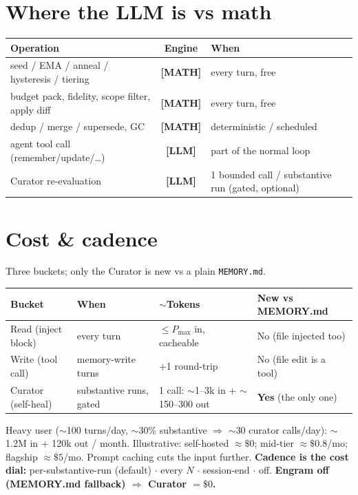 \documentclass[11pt]{article}
\newcommand{\mtag}{\textcolor{mathgreen}{\textbf{[MATH]}}}
\newcommand{\ltag}{\textcolor{llmred}{\textbf{[LLM]}}}
\begin{document}
\section{Where the LLM is vs math}
\begin{center}\small
\begin{tabular}{@{}p{6.6cm} c p{5.4cm}@{}}
\toprule
\textbf{Operation} & \textbf{Engine} & \textbf{When}\\
\midrule
seed / EMA / anneal / hysteresis / tiering & \mtag & every turn, free\\
budget pack, fidelity, scope filter, apply diff & \mtag & every turn, free\\
dedup / merge / supersede, GC & \mtag & deterministic / scheduled\\
\midrule
agent tool call (remember/update/\dots) & \ltag & part of the normal loop\\
Curator re-evaluation & \ltag & 1 bounded call / substantive run (gated, optional)\\
\bottomrule
\end{tabular}
\end{center}

\section{Cost \& cadence}
Three buckets; only the Curator is new vs a plain \texttt{MEMORY.md}.
\begin{center}\small
\begin{tabular}{@{}p{3.0cm} p{3.4cm} p{4.0cm} p{3.6cm}@{}}
\toprule
\textbf{Bucket} & \textbf{When} & \textbf{$\sim$Tokens} & \textbf{New vs MEMORY.md}\\
\midrule
Read (inject block) & every turn & $\le P_{\max}$ in, cacheable & No (file injected too)\\
Write (tool call) & memory-write turns & +1 round-trip & No (file edit is a tool)\\
Curator (self-heal) & substantive runs, gated & 1 call: $\sim$1--3k in + $\sim$150--300 out & \textbf{Yes} (the only one)\\
\bottomrule
\end{tabular}
\end{center}
Heavy user ($\sim$100 turns/day, $\sim$30\% substantive $\Rightarrow$ $\sim$30 curator calls/day): $\sim$1.2M in + 120k out / month. Illustrative: self-hosted $\approx\$0$; mid-tier $\approx\$0.8$/mo; flagship $\approx\$5$/mo. Prompt caching cuts the input further. \textbf{Cadence is the cost dial:} per-substantive-run (default) $\cdot$ every $N$ $\cdot$ session-end $\cdot$ off. \textbf{Engram off (MEMORY.md fallback) $\Rightarrow$ Curator $=\$0$.}
\end{document}
